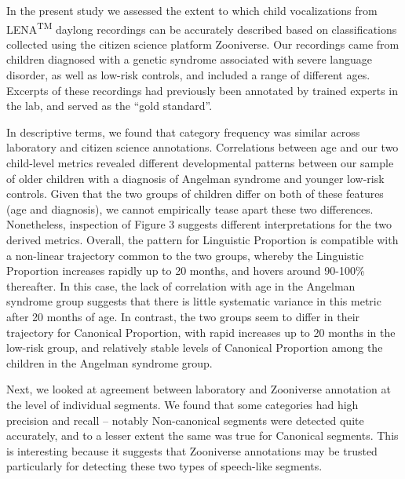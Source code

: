 \documentclass[english,,man]{apa6}
\begin{document}
In the present study we assessed the extent to which child vocalizations from LENA\textsuperscript{TM} daylong recordings can be accurately described based on classifications collected using the citizen science platform Zooniverse. Our recordings came from children diagnosed with a genetic syndrome associated with severe language disorder, as well as low-risk controls, and included a range of different ages. Excerpts of these recordings had previously been annotated by trained experts in the lab, and served as the \enquote{gold standard}.

In descriptive terms, we found that category frequency was similar across laboratory and citizen science annotations. Correlations between age and our two child-level metrics revealed different developmental patterns between our sample of older children with a diagnosis of Angelman syndrome and younger low-risk controls. Given that the two groups of children differ on both of these features (age and diagnosis), we cannot empirically tease apart these two differences. Nonetheless, inspection of Figure 3 suggests different interpretations for the two derived metrics. Overall, the pattern for Linguistic Proportion is compatible with a non-linear trajectory common to the two groups, whereby the Linguistic Proportion increases rapidly up to 20 months, and hovers around 90-100\% thereafter. In this case, the lack of correlation with age in the Angelman syndrome group suggests that there is little systematic variance in this metric after 20 months of age. In contrast, the two groups seem to differ in their trajectory for Canonical Proportion, with rapid increases up to 20 months in the low-risk group, and relatively stable levels of Canonical Proportion among the children in the Angelman syndrome group.

Next, we looked at agreement between laboratory and Zooniverse annotation at the level of individual segments. We found that some categories had high precision and recall -- notably Non-canonical segments were detected quite accurately, and to a lesser extent the same was true for Canonical segments. This is interesting because it suggests that Zooniverse annotations may be trusted particularly for detecting these two types of speech-like segments.
\end{document}
